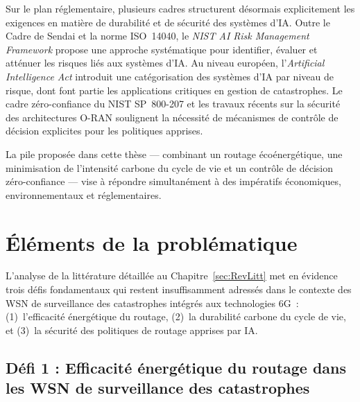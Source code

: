 Sur le plan réglementaire, plusieurs cadres structurent désormais explicitement les exigences en matière de durabilité et de sécurité des systèmes d'IA. Outre le Cadre de Sendai\cite{UNDRR2015Sendai} et la norme ISO~14040\cite{iso14040}, le \emph{NIST AI Risk Management Framework} propose une approche systématique pour identifier, évaluer et atténuer les risques liés aux systèmes d'IA\cite{nist2023airisk}. Au niveau européen, l'\emph{Artificial Intelligence Act} introduit une catégorisation des systèmes d'IA par niveau de risque, dont font partie les applications critiques en gestion de catastrophes\cite{euaiact2024}. Le cadre zéro-confiance du NIST SP~800-207 et les travaux récents sur la sécurité des architectures O-RAN soulignent la nécessité de mécanismes de contrôle de décision explicites pour les politiques apprises\cite{rose2020nist,polese2023oran,ahmadi2025zt_segmentation,ztaiot_acm2025}.

La pile proposée dans cette thèse — combinant un routage écoénergétique, une minimisation de l'intensité carbone du cycle de vie et un contrôle de décision zéro-confiance — vise à répondre simultanément à des impératifs économiques, environnementaux et réglementaires\cite{freitag2021ict,pirson2021embodied,rose2020nist,itu_ict2025}.

\section{Éléments de la problématique}\label{sec:Problematique}

L'analyse de la littérature détaillée au Chapitre~\ref{sec:RevLitt} met en évidence trois défis fondamentaux qui restent insuffisamment adressés dans le contexte des WSN de surveillance des catastrophes intégrés aux technologies 6G~: (1)~l'efficacité énergétique du routage, (2)~la durabilité carbone du cycle de vie, et (3)~la sécurité des politiques de routage apprises par IA\cite{erdelj2017disaster,freitag2021ict,metaheuristic_wsn_slr2026,alsayyed2025disaster}.

\subsection{Défi 1 : Efficacité énergétique du routage dans les WSN de surveillance des catastrophes}

